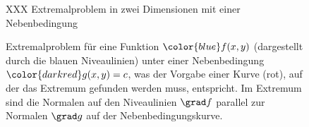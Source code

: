 %
%
%
\begin{figure}
\centering
XXX Extremalproblem in zwei Dimensionen mit einer Nebenbedingung
\caption{Extremalproblem für eine Funktion ${\color{blue}f(x,y)}$
(dargestellt durch
die {\color{blue}blauen} Niveaulinien) unter einer Nebenbedingung
${\color{darkred}g(x,y)=c}$, was der Vorgabe einer Kurve
({\color{darkred}rot}), auf der das Extremum gefunden werden muss,
entspricht.
Im Extremum sind die Normalen auf den Niveaulinien $\grad f$
parallel zur Normalen $\grad g$ auf der Nebenbedingungskurve.
\label{buch:fuvar:nebenbedingung:fig:nebenbedingung}}
\end{figure}

